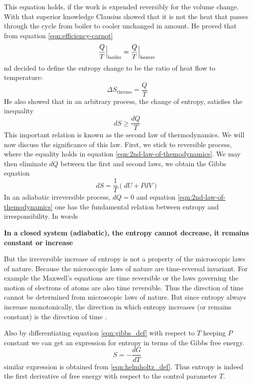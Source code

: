 	This equation holds, if the work is expended reversibly for the volume change. With that superior	knowledge Clausius showed that it is not the heat that passes through the cycle from boiler to	cooler unchanged in amount. He proved that from equation \ref{eqn:efficiency-carnot}
	\begin{equation}
		\frac{Q}{T}\at[\Big]{\text{boiler}} =
		\frac{Q}{T}\at[\Big]{\text{heater}}
	\end{equation}
	nd decided to define the entropy change to be the ratio of heat flow to temperature: \cite{Sethna2006}
	\begin{equation}
		\Delta S_{\text{thermo}} = \frac{Q}{T}
	\end{equation}
	He also showed that in an arbitrary process, the change of entropy, satisfies the inequality
	\begin{equation}
		dS \geq \frac{dQ}{T}
		\label{eqn:2nd-law-of-themodynamics}
	\end{equation}
	This important relation is known as the second law of thermodynamics. We will now discuss the significance of this law.
	First, we stick to reversible process, where the equality holds in equation \ref{eqn:2nd-law-of-themodynamics}. We may then eliminate $dQ$ between the first and second laws, we obtain the Gibbs equation
	\begin{equation}
		dS = \frac{1}{T} \left(dU + P dV\right)
	\end{equation}
	In an adiabatic irreversible process, $dQ = 0$ and equation \ref{eqn:2nd-law-of-themodynamics} one has the fundamental relation between entropy and irresponsibility. In words
	
	\textbf{In a closed system (adiabatic), the entropy cannot decrease, it remains constant or increase \cite{Benguigui2013}}
		
	But the irreversible increase of entropy is not a property of the microscopic laws of nature. Because the microscopic laws of nature are time-reversal invariant. For example the Maxwell's equations are time reversible or the laws governing the motion of electrons of atoms are also time reversible. Thus the direction of time cannot be determined from microscopic laws of nature. But since entropy always increase monotonically, the direction in which entropy increases (or remains constant) is the direction of time \cite{Sethna2006}.
	
	
	Also by differentiating equation \ref{eqn:gibbs_def} with respect to $T$ keeping $P$ constant we can get an expression for entropy in terms of the Gibbs free energy.
	\begin{equation}
		S = -\frac{dG}{dT}
	\end{equation}
	similar expression is obtained from \ref{eqn:helmholtz_def}. Thus entropy is indeed the first derivative of free energy with respect to the control parameter $T$.
	
